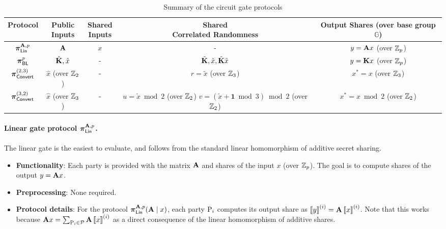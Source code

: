 \begin{table}[t!]
\centering
{
\renewcommand{\arraystretch}{1.5}
\begin{tabular}{|c|c|c|c|c|}

\hline
Protocol & \makecell{Public \\ Inputs} & \makecell{Shared \\ Inputs} & \makecell{Shared \\ Correlated Randomness} & \makecell{Output Shares \\ (over base group $\mathbb{G}$)} \\
\hline
$\prot_{\LMap}^{\mat{A},p}$ & $\mat{A}$ & $x$ & - & $y = \mat{A}x$ (over $\mathbb{Z}_p$)\\
\hline
$\boldsymbol{\pi}_{\textsf{BL}}^p$ & $\hat{\mat{K}}, \hat{x}$ & - & $\tilde{\mat{K}},\tilde{x}, \tilde{\mat{K}}\tilde{x}$ & $y = \mat{K}x$ (over $\mathbb{Z}_p$)\\
\hline
$\boldsymbol{\pi}_{\textsf{Convert}}^{(2,3)}$ & $\hat{x}$ (over $\mathbb{Z}_2$) & - & $r = \tilde{x}$ (over $\mathbb{Z}_3$) & $x^* = x$ (over $\mathbb{Z}_3$) \\
\hline
$\boldsymbol{\pi}_{\textsf{Convert}}^{(3,2)}$ & $\hat{x}$ (over $\mathbb{Z}_3$) & - & \makecell{$u = \tilde{x} \bmod 2$ (over $\mathbb{Z}_2$) \\ $v = (\tilde{x} + \textbf{1} \bmod 3) \bmod 2$ (over $\mathbb{Z}_2$)} & $x^* = x \bmod 2$ (over $\mathbb{Z}_2$) \\
\hline
\end{tabular}
}
\caption{Summary of the circuit gate protocols}
\label{table:gate_protocol_summary}
\end{table}


\paragraph{Linear gate protocol $\prot_\LMap^{\mat{A}, p}$.}
The linear gate is the easiest to evaluate, and follows from the standard linear homomorphism of additive secret sharing.

\begin{itemize}
  \item \textbf{Functionality}: Each party is provided with the matrix $\mat{A}$ and shares of the input $x$ (over $\mathbb{Z}_p$). The goal is to compute shares of the output $y = \mat{A}x$.

  \item \textbf{Preprocessing}: None required.

  \item \textbf{Protocol details}:
  For the protocol $\prot_\LMap^{\mat{A}, p}(\mat{A} \mid x)$, each party $\textnormal{P}_i$ computes its output share as $\sharei{y} = \mat{A}\sharei{x}$. Note that this works because $\mat{A}x = \sum_{\party_i \in \parties} \mat{A}\sharei{x}$ as a direct consequence of the linear homomorphism of additive shares.
\end{itemize}


